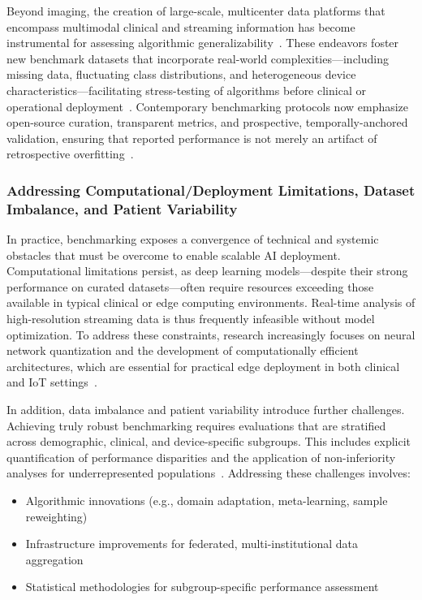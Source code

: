 \documentclass[sigconf]{acmart}
\begin{document}
Beyond imaging, the creation of large-scale, multicenter data platforms that encompass multimodal clinical and streaming information has become instrumental for assessing algorithmic generalizability~\cite{ref34,ref35,ref37,ref45,ref48,ref65,ref83}. These endeavors foster new benchmark datasets that incorporate real-world complexities—including missing data, fluctuating class distributions, and heterogeneous device characteristics—facilitating stress-testing of algorithms before clinical or operational deployment~\cite{ref83}. Contemporary benchmarking protocols now emphasize open-source curation, transparent metrics, and prospective, temporally-anchored validation, ensuring that reported performance is not merely an artifact of retrospective overfitting~\cite{ref31,ref44,ref54}.

\subsubsection{Addressing Computational/Deployment Limitations, Dataset Imbalance, and Patient Variability}

In practice, benchmarking exposes a convergence of technical and systemic obstacles that must be overcome to enable scalable AI deployment. Computational limitations persist, as deep learning models—despite their strong performance on curated datasets—often require resources exceeding those available in typical clinical or edge computing environments. Real-time analysis of high-resolution streaming data is thus frequently infeasible without model optimization. To address these constraints, research increasingly focuses on neural network quantization and the development of computationally efficient architectures, which are essential for practical edge deployment in both clinical and IoT settings~\cite{ref98,ref102,ref103,ref106}.
 
In addition, data imbalance and patient variability introduce further challenges. Achieving truly robust benchmarking requires evaluations that are stratified across demographic, clinical, and device-specific subgroups. This includes explicit quantification of performance disparities and the application of non-inferiority analyses for underrepresented populations~\cite{ref89,ref106}. Addressing these challenges involves:

\begin{itemize}
    \item Algorithmic innovations (e.g., domain adaptation, meta-learning, sample reweighting)
    \item Infrastructure improvements for federated, multi-institutional data aggregation
    \item Statistical methodologies for subgroup-specific performance assessment~\cite{ref102,ref103}
\end{itemize}
\end{document}
